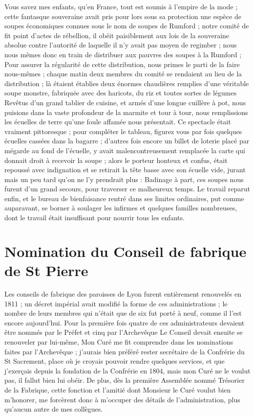 \documentclass[11pt,a4paper]{report}
\begin{document}
Vous savez mes enfants, qu'en France, tout est soumis à l'empire de la mode ; cette fantasque souveraine avait pris pour lors sous sa protection une espèce de soupes économiques connues sous le nom de soupes de Rumford ; notre comité de fit point d'actes de rébellion, il obéit paisiblement aux lois de la souveraine absolue contre l'autorité de laquelle il n'y avait pas moyen de regimber ; nous nous mêmes donc en train de distribuer aux pauvres des soupes à la Rumford ; Pour assurer la régularité de cette distribution, nous primes le parti de la faire nous-mêmes ; chaque matin deux membres du comité se rendaient au lieu de la distribution ; là étaient établies deux énormes chaudières remplies d'une véritable soupe monstre, fabriquée avec des haricots, du riz et toutes sortes de légumes Revêtus d'un grand tablier de cuisine, et armés d'une longue cuillère à pot, nous puisions dans la vaste profondeur de la marmite et tour à tour, nous remplissions les écuelles de terre qu'une foule affamée nous présentait. Ce spectacle était vraiment pittoresque ; pour compléter le tableau, figurez vous par fois quelques écuelles cassées dans la bagarre ; d'autres fois encore un billet de loterie placé par mégarde au fond de l'écuelle, y avait malencontreusement remplacée la carte qui donnait droit à recevoir la soupe ; alors le porteur honteux et confus, était repoussé avec indignation et se retirait la tête basse avec son écuelle vide, jurant mais un peu tard qu'on ne l'y prendrait plus : Badinage à part, ces soupes nous furent d'un grand secours, pour traverser ce malheureux temps. Le travail reparut enfin, et le bureau de bienfaisance rentré dans ses limites ordinaires, put comme auparavant, se borner à soulager les infirmes et quelques familles nombreuses, dont le travail était insuffisant pour nourrir tous les enfants.

\section*{Nomination du Conseil de fabrique de St Pierre}

Les conseils de fabrique des paroisses de Lyon furent entièrement renouvelés en 1811 ; un décret impérial avait modifié la forme de ces administrations ; le nombre de leurs membres qui n'était que de six fut porté à neuf, comme il l'est encore aujourd'hui. Pour la première fois quatre de ces administrateurs devaient être nommés par le Préfet et cinq par l'Archevêque Le Conseil devait ensuite se renouveler par lui-même, Mon Curé me fit comprendre dans les nominations faites par l'Archevêque ; j'aurais bien préféré rester secrétaire de la Confrérie du St Sacrement, place où je croyais pouvoir rendre quelques services, et que j'exerçais depuis la fondation de la Confrérie en 1804, mais mon Curé ne le voulut pas, il fallut bien lui obéir. De plus, dès la première Assemblée nommé Trésorier de la Fabrique, cette fonction et l'amitié dont Monsieur le Curé voulut bien m'honorer, me forcèrent donc à m'occuper des détails de l'administration, plus qu'aucun autre de mes collègues.
\end{document}
